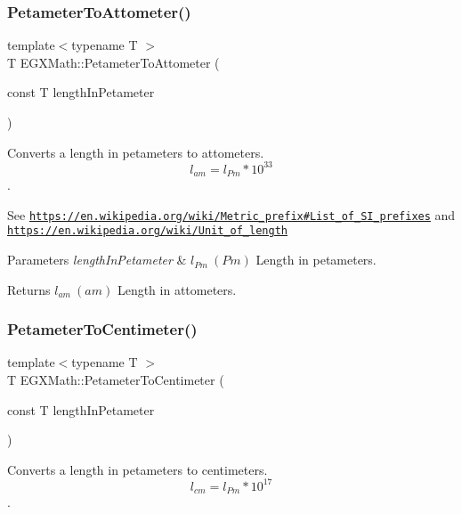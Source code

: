 \subsubsection{\texorpdfstring{Petameter\+To\+Attometer()}{PetameterToAttometer()}}
{\footnotesize\ttfamily template$<$typename T $>$ \\
T E\+G\+X\+Math\+::\+Petameter\+To\+Attometer (\begin{DoxyParamCaption}\item[{const T}]{length\+In\+Petameter }\end{DoxyParamCaption})}



Converts a length in petameters to attometers. \[ l_{am}=l_{Pm} * 10^{33} \]. 

See \href{https://en.wikipedia.org/wiki/Metric_prefix#List_of_SI_prefixes}{\tt https\+://en.\+wikipedia.\+org/wiki/\+Metric\+\_\+prefix\#\+List\+\_\+of\+\_\+\+S\+I\+\_\+prefixes} and \href{https://en.wikipedia.org/wiki/Unit_of_length}{\tt https\+://en.\+wikipedia.\+org/wiki/\+Unit\+\_\+of\+\_\+length} 
\begin{DoxyParams}{Parameters}
{\em length\+In\+Petameter} & $ l_{Pm}\ (Pm)$ Length in petameters. \\
\hline
\end{DoxyParams}
\begin{DoxyReturn}{Returns}
$ l_{am}\ (am)$ Length in attometers. 
\end{DoxyReturn}
\mbox{\label{group___e_g_x_math-_conversions-_length_conversions-_s_i-_petameter-_s_i_ga68b8b99b5e0f36fee33e5f0d0dea3f2b}} 
\subsubsection{\texorpdfstring{Petameter\+To\+Centimeter()}{PetameterToCentimeter()}}
{\footnotesize\ttfamily template$<$typename T $>$ \\
T E\+G\+X\+Math\+::\+Petameter\+To\+Centimeter (\begin{DoxyParamCaption}\item[{const T}]{length\+In\+Petameter }\end{DoxyParamCaption})}



Converts a length in petameters to centimeters. \[ l_{cm}=l_{Pm} * 10^{17} \]. 

